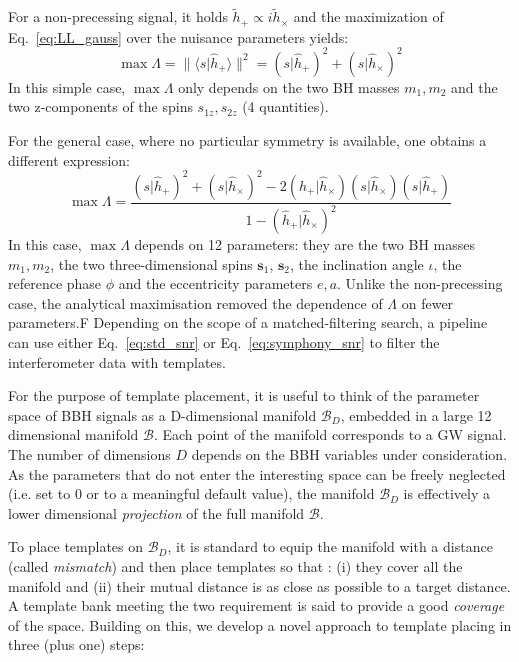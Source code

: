\documentclass[twocolumn,showpacs,preprintnumbers,nofootinbib,prd,
superscriptaddress,10pt]{revtex4-2}
\newcommand{\scalar}[2]{\langle #1|#2 \rangle}
\newcommand{\rescalar}[2]{( #1 |#2 )}
\begin{document}
For a non-precessing signal, it holds $\tilde{h}_+ \propto i\tilde{h}_\times$ and the maximization of Eq.~\eqref{eq:LL_gauss} over the nuisance parameters yields:
\begin{equation}\label{eq:std_snr}
	\max \Lambda = \lVert \scalar{s}{\hat{h}_+} \rVert^2 = \rescalar{s}{\hat{h}_+}^2 + \rescalar{s}{\hat{h}_\times}^2
\end{equation}
In this simple case, $\max\Lambda$ only depends on the two BH masses $m_1, m_2$ and the two z-components of the spins $s_{1z}, s_{2z}$ (4 quantities).

For the general case, where no particular symmetry is available, one obtains a different expression:
\begin{equation}\label{eq:symphony_snr}
	\max \Lambda = \frac{ \rescalar{s}{\hat{h}_+}^2 + \rescalar{s}{\hat{h}_\times}^2 -2\rescalar{\hat{h}_+}{\hat{h}_\times}\rescalar{s}{\hat{h}_\times}\rescalar{s}{\hat{h}_+}}{1- \rescalar{\hat{h}_+}{\hat{h}_\times}^2}
\end{equation}
In this case, $\max\Lambda$ depends on 12 parameters: they are the two BH masses $m_1, m_2$, the two three-dimensional spins $\mathbf{s}_1$, $\mathbf{s}_2$, the inclination angle $\iota$, the reference phase $\phi$ and the eccentricity parameters $e, a$.
Unlike the non-precessing case, the analytical maximisation removed the dependence of $\Lambda$ on fewer parameters.F
Depending on the scope of a matched-filtering search, a pipeline can use either Eq.~\eqref{eq:std_snr} or Eq.~\eqref{eq:symphony_snr} to filter the interferometer data with templates.

For the purpose of template placement, it is useful to think of the parameter space of BBH signals as a D-dimensional manifold $\mathcal{B}_D$, embedded in a large 12 dimensional manifold $\mathcal{B}$. Each point of the manifold corresponds to a GW signal. The number of dimensions $D$ depends on the BBH variables under consideration.
As the parameters that do not enter the interesting space can be freely neglected (i.e. set to $0$ or to a meaningful default value), the manifold $\mathcal{B}_D$ is effectively a lower dimensional {\it projection} of the full manifold $\mathcal{B}$.

To place templates on $\mathcal{B}_D$, it is standard to equip the manifold with a distance (called {\it mismatch}) and then place templates so that \cite{Allen:2021yuy}: (i) they cover all the manifold and (ii) their mutual distance is as close as possible to a target distance.
A template bank meeting the two requirement is said to provide a good {\it coverage} of the space.
Building on this, we develop a novel approach to template placing in three (plus one) steps:
\end{document}

